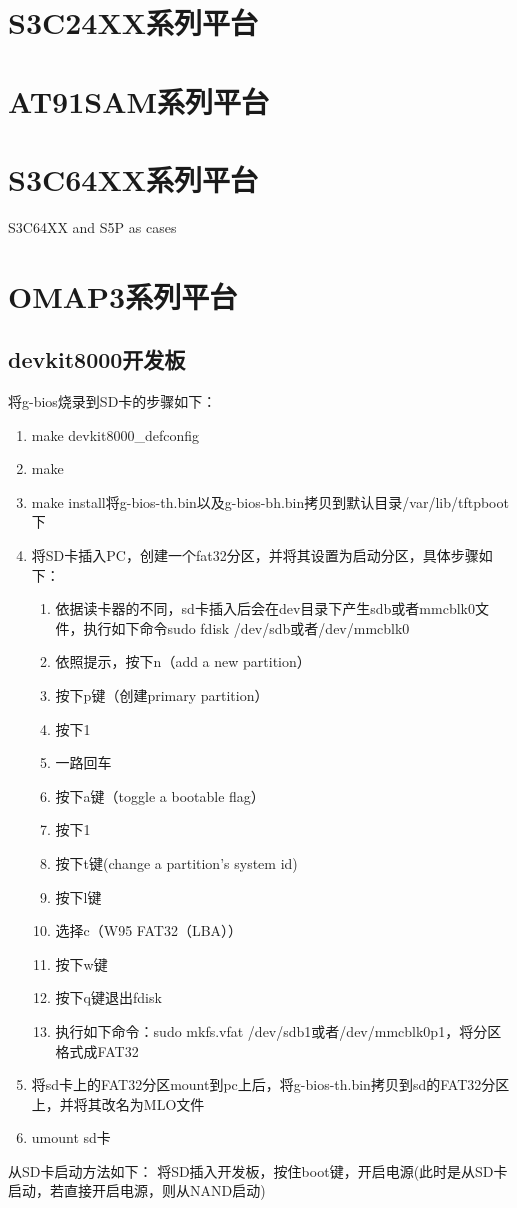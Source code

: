 \section{S3C24XX系列平台}

\section{AT91SAM系列平台}

\section{S3C64XX系列平台}
S3C64XX and S5P as cases

\section{OMAP3系列平台}
\subsection{devkit8000开发板}
将g-bios烧录到SD卡的步骤如下：
\begin{enumerate}
\item make devkit8000\_defconfig
\item make
\item make install将g-bios-th.bin以及g-bios-bh.bin拷贝到默认目录/var/lib/tftpboot下
\item 将SD卡插入PC，创建一个fat32分区，并将其设置为启动分区，具体步骤如下：
 \begin{enumerate}
  \item 依据读卡器的不同，sd卡插入后会在dev目录下产生sdb或者mmcblk0文件，执行如下命令sudo fdisk /dev/sdb或者/dev/mmcblk0
  \item 依照提示，按下n（add a new partition）
  \item 按下p键（创建primary partition）
  \item 按下1
  \item 一路回车
  \item 按下a键（toggle a bootable flag）
  \item 按下1
  \item 按下t键(change a partition's system id)
  \item 按下l键
  \item 选择c（W95 FAT32（LBA））
  \item 按下w键
  \item 按下q键退出fdisk
  \item 执行如下命令：sudo mkfs.vfat /dev/sdb1或者/dev/mmcblk0p1，将分区格式成FAT32
 \end{enumerate}
\item 将sd卡上的FAT32分区mount到pc上后，将g-bios-th.bin拷贝到sd的FAT32分区上，并将其改名为MLO文件
\item umount sd卡
\end{enumerate}
从SD卡启动方法如下：
将SD插入开发板，按住boot键，开启电源(此时是从SD卡启动，若直接开启电源，则从NAND启动)
